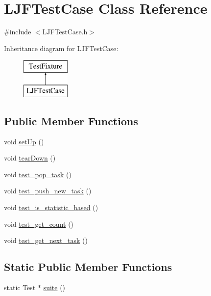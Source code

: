 \hypertarget{class_l_j_f_test_case}{}\section{L\+J\+F\+Test\+Case Class Reference}
\label{class_l_j_f_test_case}


{\ttfamily \#include $<$L\+J\+F\+Test\+Case.\+h$>$}

Inheritance diagram for L\+J\+F\+Test\+Case\+:\begin{figure}[H]
\begin{center}
\leavevmode
\includegraphics[height=2.000000cm]{class_l_j_f_test_case}
\end{center}
\end{figure}
\subsection*{Public Member Functions}
\begin{DoxyCompactItemize}
\item 
void \hyperlink{class_l_j_f_test_case_ab3b5deb3ab468b271d65041c3ba418eb}{set\+Up} ()
\item 
void \hyperlink{class_l_j_f_test_case_a47f0772df53a900d6870f970625f6d7a}{tear\+Down} ()
\item 
void \hyperlink{class_l_j_f_test_case_a541d3c9f1e4ecbd03e4f777edf4a9a13}{test\+\_\+pop\+\_\+task} ()
\item 
void \hyperlink{class_l_j_f_test_case_a381a8c163616c0752ce59ca44aff5849}{test\+\_\+push\+\_\+new\+\_\+task} ()
\item 
void \hyperlink{class_l_j_f_test_case_a81f6f3b146f1d10b687dc647d4398987}{test\+\_\+is\+\_\+statistic\+\_\+based} ()
\item 
void \hyperlink{class_l_j_f_test_case_aad808d4d522ec3ad9b1ab33abad16f24}{test\+\_\+get\+\_\+count} ()
\item 
void \hyperlink{class_l_j_f_test_case_a429f7b9280917c4ffd3cf898d7d804c1}{test\+\_\+get\+\_\+next\+\_\+task} ()
\end{DoxyCompactItemize}
\subsection*{Static Public Member Functions}
\begin{DoxyCompactItemize}
\item 
static Test $\ast$ \hyperlink{class_l_j_f_test_case_a1f51591cecf2427561abd7efda1f56ab}{suite} ()
\end{DoxyCompactItemize}


